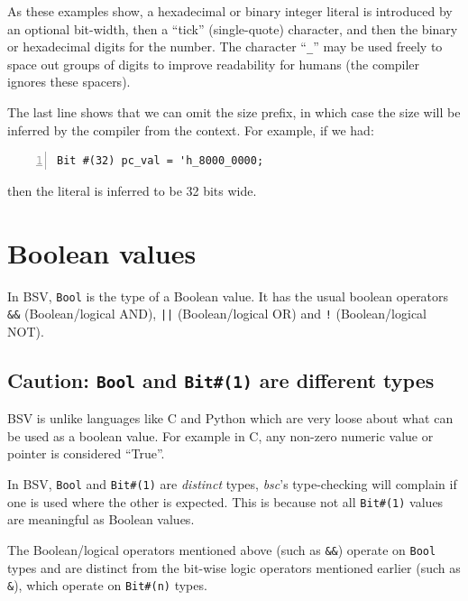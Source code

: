 As these examples show, a hexadecimal or binary integer literal is
introduced by an optional bit-width, then a ``tick'' (single-quote)
character, and then the binary or hexadecimal digits for the number.
The character ``{\verb|_|}'' may be used freely to space out groups of
digits to improve readability for humans (the compiler ignores these
spacers).

The last line shows that we can omit the size prefix, in which case
the size will be inferred by the compiler from the context. For
example, if we had:

{\small
\begin{Verbatim}[frame=single, numbers=left]
   Bit #(32) pc_val = 'h_8000_0000;
\end{Verbatim}
}

then the literal is inferred to be 32 bits wide.


\section{Boolean values}

\label{Sec_BSV_Boolean_values}


In BSV, \verb|Bool| is the type of a Boolean value. It has the usual
boolean operators \verb|&&| (Boolean/logical AND), \verb'||'
(Boolean/logical OR) and \verb|!| (Boolean/logical NOT).


\subsection{Caution: {\tt Bool} and {\tt Bit\#(1)} are different types}

BSV is unlike languages like C and Python which are very loose about
what can be used as a boolean value.  For example in C, any non-zero
numeric value or pointer is considered ``True''.

In BSV, \verb|Bool| and \verb|Bit#(1)| are \emph{distinct} types,
{\ie} \emph{bsc}'s type-checking will complain if one is used where
the other is expected.  This is because not all \verb|Bit#(1)| values
are meaningful as Boolean values.

The Boolean/logical operators mentioned above (such as \verb|&&|)
operate on \verb|Bool| types and are distinct from the bit-wise logic
operators mentioned earlier (such as \verb|&|), which operate on
\verb|Bit#(n)| types.

